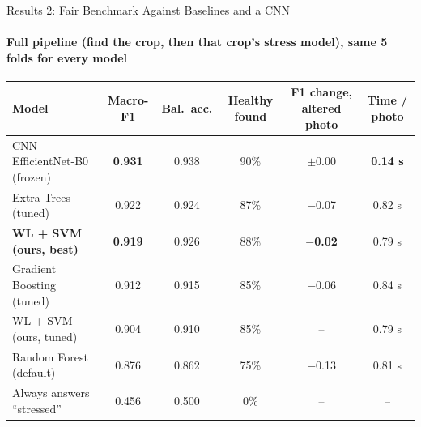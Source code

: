 \documentclass[aspectratio=169, 11pt]{beamer}
\begin{document}
\begin{frame}{Results 2: Fair Benchmark Against Baselines and a CNN}
    \framesubtitle{Full pipeline (find the crop, then that crop's stress model), same 5 folds for every model}

    \centering
    \scriptsize
    \setlength{\tabcolsep}{3.5pt}
    \renewcommand{\arraystretch}{1.18}
    \begin{tabular}{@{}l c c c c c@{}}
        \toprule
        \textbf{Model} & \textbf{Macro-F1} & \textbf{Bal.\ acc.} & \textbf{Healthy found} & \textbf{F1 change, altered photo} & \textbf{Time / photo} \\
        \midrule
        CNN EfficientNet-B0 (frozen) & \textbf{0.931} & 0.938 & 90\% & $\pm$0.00 & \textbf{0.14 s} \\
        Extra Trees (tuned) & 0.922 & 0.924 & 87\% & $-$0.07 & 0.82 s \\
        \rowcolor{maroonSoft}
        \textbf{\textcolor{amritaMaroon}{WL + SVM (ours, best)}} & \textbf{0.919} & 0.926 & 88\% & \textbf{$-$0.02} & 0.79 s \\
        Gradient Boosting (tuned) & 0.912 & 0.915 & 85\% & $-$0.06 & 0.84 s \\
        \rowcolor{maroonSoft}
        WL + SVM (ours, tuned) & 0.904 & 0.910 & 85\% & -- & 0.79 s \\
        Random Forest (default) & 0.876 & 0.862 & 75\% & $-$0.13 & 0.81 s \\
        \midrule
        Always answers ``stressed'' & 0.456 & 0.500 & 0\% & -- & -- \\
        \bottomrule
    \end{tabular}

    \vspace{0.05cm}



\end{frame}
\end{document}
